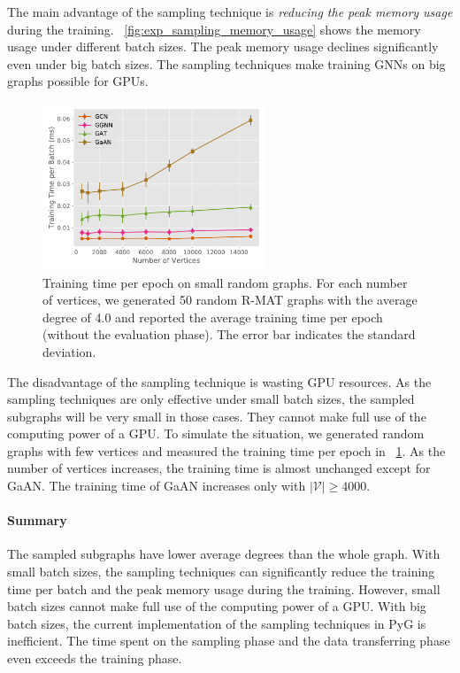 The main advantage of the sampling technique is \emph{reducing the peak memory usage} during the training.
\figurename~\ref{fig:exp_sampling_memory_usage} shows the memory usage under different batch sizes.
The peak memory usage declines significantly even under big batch sizes.
The sampling techniques make training GNNs on big graphs possible for GPUs.

\begin{figure}[tbp]
    \centering
    \includegraphics[height=5cm]{figs/experiments/exp_small_graph_train_time.pdf}
    \caption{Training time per epoch on small random graphs. For each number of vertices, we generated 50 random R-MAT graphs with the average degree of 4.0 and reported the average training time per epoch (without the evaluation phase). The error bar indicates the standard deviation.}
    \label{fig:exp_small_graph_train_time}
\end{figure}

The disadvantage of the sampling technique is wasting GPU resources.
As the sampling techniques are only effective under small batch sizes, the sampled subgraphs will be very small in those cases.
They cannot make full use of the computing power of a GPU.
To simulate the situation, we generated random graphs with few vertices and measured the training time per epoch in \figurename~\ref{fig:exp_small_graph_train_time}.
As the number of vertices increases, the training time is almost unchanged except for GaAN.
The training time of GaAN increases only with $|\mathcal{V}| \geq 4000$.


\paragraph{Summary}
The sampled subgraphs have lower average degrees than the whole graph.
With small batch sizes, the sampling techniques can significantly reduce the training time per batch and the peak memory usage during the training.
However, small batch sizes cannot make full use of the computing power of a GPU.
With big batch sizes, the current implementation of the sampling techniques in PyG is inefficient.
The time spent on the sampling phase and the data transferring phase even exceeds the training phase.
